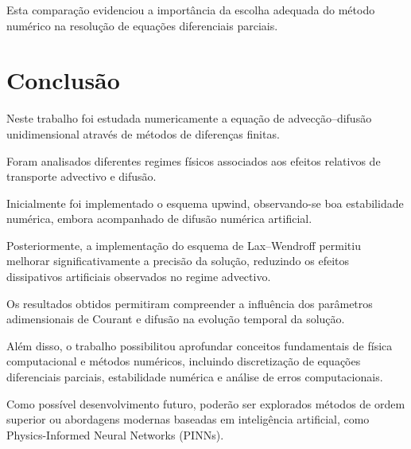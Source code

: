 \documentclass{article}
\begin{document}
Esta comparação evidenciou a importância da escolha adequada do método numérico na resolução de equações diferenciais parciais.

\section{Conclusão}

Neste trabalho foi estudada numericamente a equação de advecção--difusão unidimensional através de métodos de diferenças finitas.

Foram analisados diferentes regimes físicos associados aos efeitos relativos de transporte advectivo e difusão.

Inicialmente foi implementado o esquema upwind, observando-se boa estabilidade numérica, embora acompanhado de difusão numérica artificial.

Posteriormente, a implementação do esquema de Lax--Wendroff permitiu melhorar significativamente a precisão da solução, reduzindo os efeitos dissipativos artificiais observados no regime advectivo.

Os resultados obtidos permitiram compreender a influência dos parâmetros adimensionais de Courant e difusão na evolução temporal da solução.

Além disso, o trabalho possibilitou aprofundar conceitos fundamentais de física computacional e métodos numéricos, incluindo discretização de equações diferenciais parciais, estabilidade numérica e análise de erros computacionais.

Como possível desenvolvimento futuro, poderão ser explorados métodos de ordem superior ou abordagens modernas baseadas em inteligência artificial, como Physics-Informed Neural Networks (PINNs).
\end{document}
